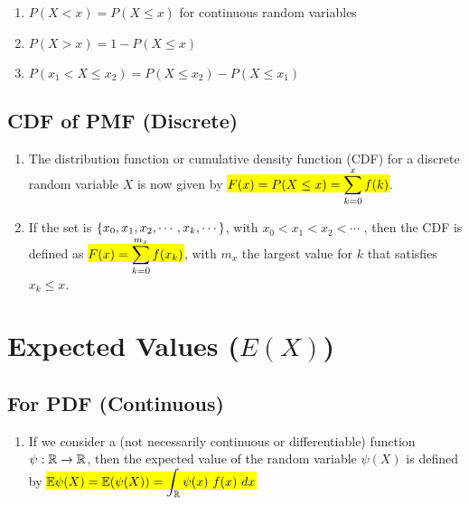 \begin{enumerate}
    \item $P(X < x) = P(X \leq x)$ for continuous random variables

    \item $P(X > x) = 1 - P(X \leq x)$
    \hfill \cite{statistics/book/Statistics-for-Data-Scientists/Maurits-Kaptein}

    \item $P( x_1 < X \leq x_2) = P(X \leq x_2) - P(X \leq x_1)$
    \hfill \cite{statistics/book/Statistics-for-Data-Scientists/Maurits-Kaptein}
\end{enumerate}



\subsection{CDF of PMF (Discrete)}

\begin{enumerate}
    \item The distribution function or cumulative density function (CDF) for a discrete random variable $X$ is now given by \colorbox{yellow}{$F(x) = P(X \leq x) = \displaystyle\sum^{x}_ {k=0} f (k)$}.
    \hfill \cite{statistics/book/Statistics-for-Data-Scientists/Maurits-Kaptein}

    \item If the set is $\left\{x_0, x_1, x_2, \cdots , x _k , \cdots\right\}$, with $x_0 < x_1 < x_2 < \cdots$ , then the CDF is defined as \colorbox{yellow}{$F(x) =\displaystyle\sum^{m_x} _{k=0} f (x _k )$}, with $m _x$ the largest value for $k$ that satisfies $x_ k \leq x$.
    \hfill \cite{statistics/book/Statistics-for-Data-Scientists/Maurits-Kaptein}
\end{enumerate}




\section{Expected Values ($E(X)$)}

\subsection{For PDF (Continuous)}

\begin{enumerate}
    \item If we consider a (not necessarily continuous or differentiable) function $\psi : \mathbb{R} \to \mathbb{R}$, then the expected value of the random variable $\psi (X)$ is defined by
    \colorbox{yellow}{$
        \mathbb{E}\psi(X)
        = \mathbb{E}(\psi(X))
        = \displaystyle\int_{\mathbb{R}} \psi(x)\ f(x)\ dx
    $}
    \hfill \cite{statistics/book/Statistics-for-Data-Scientists/Maurits-Kaptein}
\end{enumerate}

